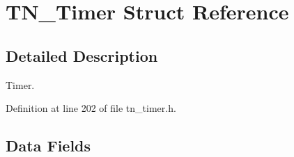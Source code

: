\hypertarget{structTN__Timer}{\section{T\+N\+\_\+\+Timer Struct Reference}
\label{structTN__Timer}
}


\subsection{Detailed Description}
Timer. 

Definition at line 202 of file tn\+\_\+timer.\+h.

\subsection*{Data Fields}
